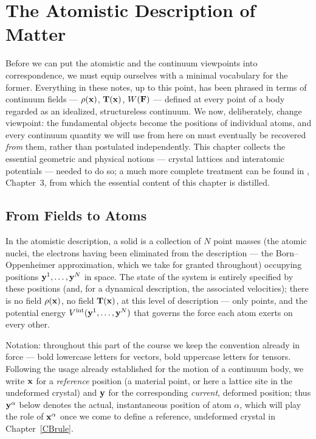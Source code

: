 \chapter{The Atomistic Description of Matter}\label{atomdescr}

Before we can put the atomistic and the continuum viewpoints into correspondence, we must equip ourselves with a minimal vocabulary for the former. Everything in these notes, up to this point, has been phrased in terms of continuum fields --- $\rho(\mathbf{x})$, $\mathbf{T}(\mathbf{x})$, $W(\mathbf{F})$ --- defined at every point of a body regarded as an idealized, structureless continuum. We now, deliberately, change viewpoint: the fundamental objects become the positions of individual atoms, and every continuum quantity we will use from here on must eventually be recovered \textit{from} them, rather than postulated independently. This chapter collects the essential geometric and physical notions --- crystal lattices and interatomic potentials --- needed to do so; a much more complete treatment can be found in \cite{TadmorMiller}, Chapter~3, from which the essential content of this chapter is distilled.

\section{From Fields to Atoms}

In the atomistic description, a solid is a collection of $N$ point masses (the atomic nuclei, the electrons having been eliminated from the description --- the Born--Oppenheimer approximation, which we take for granted throughout) occupying positions $\mathbf{y}^1,\ldots,\mathbf{y}^N$ in space. The state of the system is entirely specified by these positions (and, for a dynamical description, the associated velocities); there is no field $\rho(\mathbf{x})$, no field $\mathbf{T}(\mathbf{x})$, at this level of description --- only points, and the potential energy $V^{\rm int}(\mathbf{y}^1,\ldots,\mathbf{y}^N)$ that governs the force each atom exerts on every other.

\begin{remark}
	Notation: throughout this part of the course we keep the convention already in force --- bold lowercase letters for vectors, bold uppercase letters for tensors. Following the usage already established for the motion of a continuum body, we write $\mathbf{x}$ for a \textit{reference} position (a material point, or here a lattice site in the undeformed crystal) and $\mathbf{y}$ for the corresponding \textit{current}, deformed position; thus $\mathbf{y}^\alpha$ below denotes the actual, instantaneous position of atom $\alpha$, which will play the role of $\mathbf{x}^\alpha$ once we come to define a reference, undeformed crystal in Chapter~\ref{CBrule}.
\end{remark}

